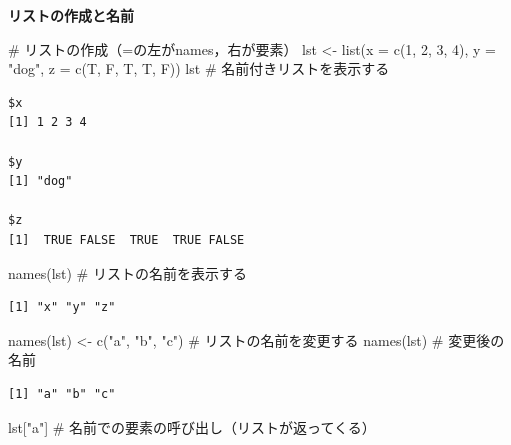\documentclass[
  letterpaper,
  DIV=11,
  numbers=noendperiod]{scrreprt}
\newenvironment{Shaded}{\begin{snugshade}}{\end{snugshade}}
\newcommand{\AttributeTok}[1]{\textcolor[rgb]{0.40,0.45,0.13}{#1}}
\newcommand{\CommentTok}[1]{\textcolor[rgb]{0.37,0.37,0.37}{#1}}
\newcommand{\DecValTok}[1]{\textcolor[rgb]{0.68,0.00,0.00}{#1}}
\newcommand{\FunctionTok}[1]{\textcolor[rgb]{0.28,0.35,0.67}{#1}}
\newcommand{\NormalTok}[1]{\textcolor[rgb]{0.00,0.23,0.31}{#1}}
\newcommand{\OtherTok}[1]{\textcolor[rgb]{0.00,0.23,0.31}{#1}}
\newcommand{\StringTok}[1]{\textcolor[rgb]{0.13,0.47,0.30}{#1}}
\begin{document}
\textbf{リストの作成と名前}

\begin{Shaded}
\begin{Highlighting}[]
\CommentTok{\# リストの作成（=の左がnames，右が要素）}
\NormalTok{lst }\OtherTok{\textless{}{-}} \FunctionTok{list}\NormalTok{(}\AttributeTok{x =} \FunctionTok{c}\NormalTok{(}\DecValTok{1}\NormalTok{, }\DecValTok{2}\NormalTok{, }\DecValTok{3}\NormalTok{, }\DecValTok{4}\NormalTok{), }\AttributeTok{y =} \StringTok{"dog"}\NormalTok{, }\AttributeTok{z =} \FunctionTok{c}\NormalTok{(T, F, T, T, F))}
\NormalTok{lst }\CommentTok{\# 名前付きリストを表示する}
\end{Highlighting}
\end{Shaded}

\begin{verbatim}
$x
[1] 1 2 3 4

$y
[1] "dog"

$z
[1]  TRUE FALSE  TRUE  TRUE FALSE
\end{verbatim}

\begin{Shaded}
\begin{Highlighting}[]
\FunctionTok{names}\NormalTok{(lst) }\CommentTok{\# リストの名前を表示する}
\end{Highlighting}
\end{Shaded}

\begin{verbatim}
[1] "x" "y" "z"
\end{verbatim}

\begin{Shaded}
\begin{Highlighting}[]
\FunctionTok{names}\NormalTok{(lst) }\OtherTok{\textless{}{-}} \FunctionTok{c}\NormalTok{(}\StringTok{"a"}\NormalTok{, }\StringTok{"b"}\NormalTok{, }\StringTok{"c"}\NormalTok{) }\CommentTok{\# リストの名前を変更する}
\FunctionTok{names}\NormalTok{(lst) }\CommentTok{\# 変更後の名前}
\end{Highlighting}
\end{Shaded}

\begin{verbatim}
[1] "a" "b" "c"
\end{verbatim}

\begin{Shaded}
\begin{Highlighting}[]
\NormalTok{lst[}\StringTok{"a"}\NormalTok{] }\CommentTok{\# 名前での要素の呼び出し（リストが返ってくる）}
\end{Highlighting}
\end{Shaded}
\end{document}
